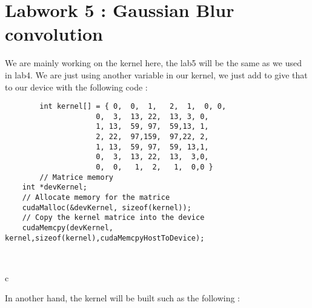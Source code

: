 \documentclass[paper=a4, fontsize=11pt]{scrartcl}
\begin{document}
\section{Labwork 5 : Gaussian Blur convolution}

    We are mainly working on the kernel here, the lab5 will be the same as we used in lab4. We are just using another variable in our kernel, we just add to give that to our device with the following code :

    \begin{verbatim}
        int kernel[] = { 0,  0,  1,   2,  1,  0, 0,  
                 	 0,  3,  13, 22,  13, 3, 0,  
                 	 1, 13,  59, 97,  59,13, 1,  
                 	 2, 22,  97,159,  97,22, 2,  
                 	 1, 13,  59, 97,  59, 13,1,  
                 	 0,  3,  13, 22,  13,  3,0,
                 	 0,  0,   1,  2,   1,  0,0 }
        // Matrice memory
	int *devKernel;
	// Allocate memory for the matrice
	cudaMalloc(&devKernel, sizeof(kernel));
	// Copy the kernel matrice into the device
	cudaMemcpy(devKernel, kernel,sizeof(kernel),cudaMemcpyHostToDevice);
	
                 	                 	 

    \end{verbatim}{c}
    
    In another hand, the kernel will be built such as the following :\newline
    
\end{document}
